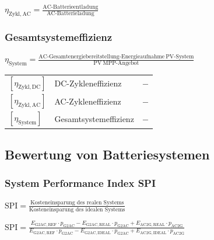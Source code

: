 \vspace{0.1cm}

$
\boxed{
\eta_\mathrm{Zykl,AC} = \frac{\mathrm{AC\text{-}Batterieentladung}}{\mathrm{AC\text{-}Batterieladung}}
}
$

\subsubsection{Gesamtsystemeffizienz}

\vspace{0.1cm}

$
\boxed{
\eta_\mathrm{System} = \frac{\mathrm{AC\text{-}Gesamtenergiebereitstellung\text{-}Energieaufnahme\ PV\text{-}System}}{\mathrm{PV\ MPP\text{-}Angebot}}
}
$

\vspace{0.1cm}

\renewcommand{\arraystretch}{1.2}
\begin{tabular}{@{} l p{6.5cm} l @{}}
    $[\eta_\mathrm{Zykl,DC}]$   & DC-Zykleneffizienz \dotfill & $-$ \\
    $[\eta_\mathrm{Zykl,AC}]$   & AC-Zykleneffizienz \dotfill & $-$ \\
    $[\eta_\mathrm{System}]$    & Gesamtsystemeffizienz \dotfill & $-$ \\
\end{tabular}



\subsection{Bewertung von Batteriesystemen}

\subsubsection{System Performance Index SPI}

\vspace{0.1cm}

$\boxed{
\mathrm{SPI} = \frac{\text{Kosteneinsparung des realen Systems}}{\text{Kosteneinsparung des idealen Systems}}
}$

\vspace{0.1cm}

$\boxed{
\mathrm{SPI} = \frac{E_{\mathrm{G2AC,REF}} \cdot p_{\mathrm{G2AC}} - E_{\mathrm{G2AC,REAL}} \cdot p_{\mathrm{G2AC}} + E_{\mathrm{AC2G,REAL}} \cdot p_{\mathrm{AC2G}}}{E_{\mathrm{G2AC,REF}} \cdot p_{\mathrm{G2AC}} - E_{\mathrm{G2AC,IDEAL}} \cdot p_{\mathrm{G2AC}} + E_{\mathrm{AC2G,IDEAL}} \cdot p_{\mathrm{AC2G}}}
}$

